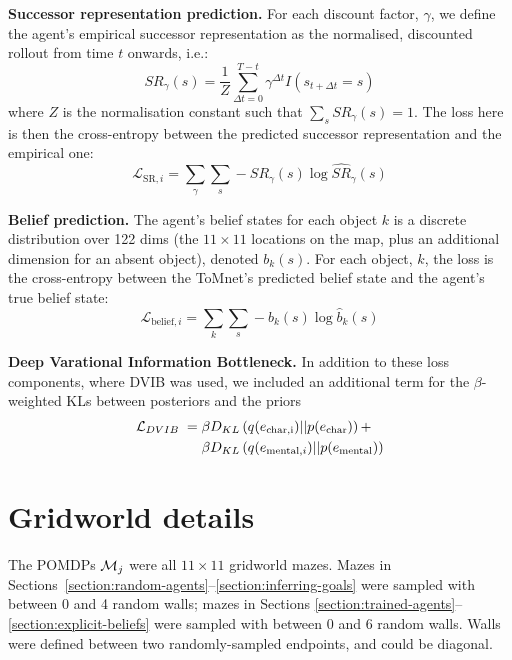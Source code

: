 \documentclass{article}
\begin{document}
{\bf Successor representation prediction.} For each discount factor, $\gamma$, we define the agent's empirical successor representation as the normalised, discounted rollout from time $t$ onwards, i.e.:
\begin{equation*}
    SR_{\gamma}(s) = \frac 1 Z \sum_{\Delta t = 0}^{T - t} \gamma^{\Delta t} I(s_{t + \Delta t} = s)
\end{equation*}
where $Z$ is the normalisation constant such that $\sum_{s} SR_{\gamma}(s) = 1$. The loss here is then the cross-entropy between the predicted successor representation and the empirical one:
\begin{equation*}
    \mathcal{L}_{\mathrm{SR}, i} = \sum_{\gamma} \sum_s -SR_{\gamma}(s) \log \widehat{SR}_{\gamma}(s)
\end{equation*}

{\bf Belief prediction.} The agent's belief states for each object $k$ is a discrete distribution over 122 dims (the $11 \times 11$ locations on the map, plus an additional dimension for an absent object), denoted $b_k(s)$. For each object, $k$, the loss is the cross-entropy between the ToMnet's predicted belief state and the agent's true belief state:
\begin{equation*}
    \mathcal{L}_{\mathrm{belief}, i} = \sum_{k} \sum_s -b_{k}(s) \log \hat{b}_{k}(s)
\end{equation*}

{\bf Deep Varational Information Bottleneck.} In addition to these loss components, where DVIB was used, we included an additional term for the $\beta$-weighted KLs between posteriors and the priors
\begin{align*}
    \mathcal{L}_{DVIB} \;=\;
        &\beta D_{KL}\left( q(e_{\mathrm{char,i}}) || p(e_{\mathrm{char}}) \right) + \\
        &\beta D_{KL}\left( q(e_{\mathrm{mental},i}) || p(e_{\mathrm{mental}}) \right)
\end{align*}


\newpage
\section{Gridworld details}
\label{appendix:gridworlds}

The POMDPs $\mathcal{M}_j$ were all $11 \times 11$ gridworld mazes. Mazes in Sections~\ref{section:random-agents}--\ref{section:inferring-goals} were sampled with between 0 and 4 random walls; mazes in Sections \ref{section:trained-agents}--\ref{section:explicit-beliefs} were sampled with between 0 and 6 random walls. Walls were defined between two randomly-sampled endpoints, and could be diagonal.
\end{document}

